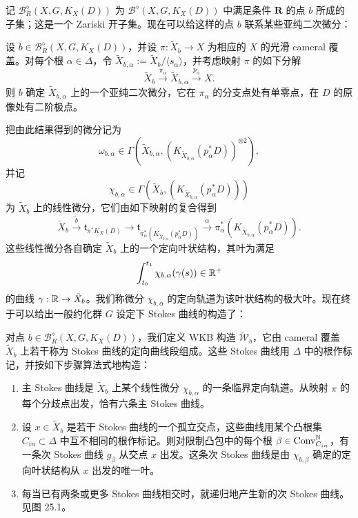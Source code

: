 记 $\mathcal{B}_R^{\diamond}(X,G,K_X(D))$ 为 $\mathcal{B}^{\diamond}(X,G,K_X(D))$ 中满足条件 $\mathbf{R}$ 的点 $b$ 所成的子集；这是一个 Zariski 开子集。现在可以给这样的点 $b$ 联系某些亚纯二次微分：

\begin{proposition}[25.7（{{{{{[214]}}}}, {{{{[274]}}}}, {{{{[215]}}}}}）] 设 $b\in\mathcal{B}_R^{\diamond}(X,G,K_X(D))$，并设 $\pi:\tilde X_b\to X$ 为相应的 $X$ 的光滑 cameral 覆盖。对每个根 $\alpha\in\Delta$，令 $\tilde X_{b,\alpha}:=\tilde X_b/\langle s_\alpha\rangle$，并考虑映射 $\pi$ 的如下分解
\[
\tilde X_b\xrightarrow{\pi_\alpha}\tilde X_{b,\alpha}\xrightarrow{p_\alpha}X.
\]
则 $b$ 确定 $\tilde X_{b,\alpha}$ 上的一个亚纯二次微分，它在 $\pi_\alpha$ 的分支点处有单零点，在 $D$ 的原像处有二阶极点。\end{proposition}

把由此结果得到的微分记为
\[
\omega_{b,\alpha}\in\Gamma\left(\tilde X_{b,\alpha},\left(K_{\tilde X_{b,\alpha}}(p_\alpha^*D)\right)^{\otimes 2}\right),
\]
并记
\[
\chi_{b,\alpha}\in\Gamma\left(\tilde X_b,\left(K_{\tilde X_{b,\alpha}}(p_\alpha^*D)\right)\right)
\]
为 $\tilde X_b$ 上的线性微分，它们由如下映射的复合得到
\[
\tilde X_b\xrightarrow{\tilde b}\mathfrak{t}_{\pi^*K_X(D)}\to\mathfrak{t}_{\pi_\alpha^*(K_{\tilde X_{b,\alpha}}(p_\alpha^*D))}\xrightarrow{\alpha}\pi_\alpha^*(K_{\tilde X_{b,\alpha}}(p_\alpha^*D)).
\]
这些线性微分各自确定 $\tilde X_b$ 上的一个定向叶状结构，其叶为满足
\[
\int_{t_0}^{t_1}\chi_{b,\alpha}(\gamma(s))\in\mathbb{R}^+
\]
的曲线 $\gamma:\mathbb{R}\to\tilde X_b$。我们称微分 $\chi_{b,\alpha}$ 的定向轨道为该叶状结构的极大叶。现在终于可以给出一般约化群 $G$ 设定下 Stokes 曲线的构造了：

\begin{definition}[25.8（{{{{{[214]}}}}, {{{{[274]}}}}, {{{{[215]}}}}}）] 对点 $b\in\mathcal{B}_R^{\diamond}(X,G,K_X(D))$，我们定义 WKB 构造 $\widetilde{\mathcal{W}}_b$，它由 cameral 覆盖 $\tilde X_b$ 上若干称为 Stokes 曲线的定向曲线段组成。这些 Stokes 曲线用 $\Delta$ 中的根作标记，并按如下步骤算法式地构造：
\begin{enumerate}
  \item 主 Stokes 曲线是 $\tilde X_b$ 上某个线性微分 $\chi_{b,\alpha}$ 的一条临界定向轨道。从映射 $\pi$ 的每个分歧点出发，恰有六条主 Stokes 曲线。
  \item 设 $x\in\tilde X_b$ 是若干 Stokes 曲线的一个孤立交点，这些曲线用某个凸根集 $C_{in}\subset\Delta$ 中互不相同的根作标记。则对限制凸包中的每个根 $\beta\in\operatorname{Conv}^{\mathbb{N}}_{C_{in}}$，有一条次 Stokes 曲线 $g_\beta$ 从交点 $x$ 出发。这条次 Stokes 曲线是由 $\chi_{b,\beta}$ 确定的定向叶状结构从 $x$ 出发的唯一叶。
  \item 每当已有两条或更多 Stokes 曲线相交时，就递归地产生新的次 Stokes 曲线。见图 25.1。
\end{enumerate}
\end{definition}

